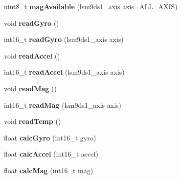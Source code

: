 \begin{DoxyCompactItemize}
\item 
uint8\+\_\+t {\bfseries mag\+Available} (lsm9ds1\+\_\+axis axis=A\+L\+L\+\_\+\+A\+X\+IS)\hypertarget{classLSM9DS1_a85afd29e95bead7b3f0083a9a235d1df}{}\label{classLSM9DS1_a85afd29e95bead7b3f0083a9a235d1df}

\item 
void {\bfseries read\+Gyro} ()\hypertarget{classLSM9DS1_a56e9710cb538a4c7f7ab94c2ca256ce9}{}\label{classLSM9DS1_a56e9710cb538a4c7f7ab94c2ca256ce9}

\item 
int16\+\_\+t {\bfseries read\+Gyro} (lsm9ds1\+\_\+axis axis)\hypertarget{classLSM9DS1_adc1b37609a6c850328b16da4f911cefd}{}\label{classLSM9DS1_adc1b37609a6c850328b16da4f911cefd}

\item 
void {\bfseries read\+Accel} ()\hypertarget{classLSM9DS1_a9953684a1ff652a7d3a4d91e72bccaa1}{}\label{classLSM9DS1_a9953684a1ff652a7d3a4d91e72bccaa1}

\item 
int16\+\_\+t {\bfseries read\+Accel} (lsm9ds1\+\_\+axis axis)\hypertarget{classLSM9DS1_acbe3bfc0b8db7fe3f77893d22c394594}{}\label{classLSM9DS1_acbe3bfc0b8db7fe3f77893d22c394594}

\item 
void {\bfseries read\+Mag} ()\hypertarget{classLSM9DS1_ae127cf75aa5f3c5421e49363795dcd38}{}\label{classLSM9DS1_ae127cf75aa5f3c5421e49363795dcd38}

\item 
int16\+\_\+t {\bfseries read\+Mag} (lsm9ds1\+\_\+axis axis)\hypertarget{classLSM9DS1_a615fd3ab32a9af833ef9899663100330}{}\label{classLSM9DS1_a615fd3ab32a9af833ef9899663100330}

\item 
void {\bfseries read\+Temp} ()\hypertarget{classLSM9DS1_aca21a51dc79a1287b97ed9c326e2080b}{}\label{classLSM9DS1_aca21a51dc79a1287b97ed9c326e2080b}

\item 
float {\bfseries calc\+Gyro} (int16\+\_\+t gyro)\hypertarget{classLSM9DS1_a76707323565bc4170ea8e27a932c95e4}{}\label{classLSM9DS1_a76707323565bc4170ea8e27a932c95e4}

\item 
float {\bfseries calc\+Accel} (int16\+\_\+t accel)\hypertarget{classLSM9DS1_a54e2a7888b67b47cf0dd986c5b91a3c5}{}\label{classLSM9DS1_a54e2a7888b67b47cf0dd986c5b91a3c5}

\item 
float {\bfseries calc\+Mag} (int16\+\_\+t mag)\hypertarget{classLSM9DS1_a7d0b0740497b1a10cd3e46a282a143ec}{}\label{classLSM9DS1_a7d0b0740497b1a10cd3e46a282a143ec}


\end{DoxyCompactItemize}
